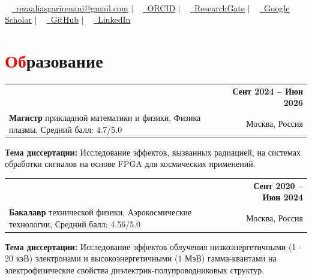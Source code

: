 \documentclass[a4paper, 10pt]{article}
\makeatletter
\newcommand{\resumeItem}[1]{
    \item\small{
        {#1 \vspace{-2pt}}
    }
}
\newcommand{\resumeSubheading}[4]{
    \vspace{-2pt}\item
    \begin{tabular*}{1.0\textwidth}[t]{l@{\extracolsep{\fill}}r}
        \textbf{#1} & \textbf{\small #2} \\
        \small#3 & \small #4
    \end{tabular*}\vspace{-7pt}
}
\newcommand{\resumeSubHeadingListStart}{\begin{itemize}[leftmargin=0.0in, label={}]}
\newcommand{\resumeSubHeadingListEnd}{\end{itemize}}
\makeatother
\begin{document}
\begin{center}
    {\Huge {\fontsize{25}{30}\selectfont{Реза}} {\fontsize{25}{30}}} \\ \vspace{3pt}
    \small ~ 
    \href{mailto:rezaaliasgarirenani@gmail.com}{\raisebox{-0.2\height}\faEnvelope\ \underline{rezaaliasgarirenani@gmail.com}} $|$ ~
    \href{https://orcid.org/0009-0000-8983-755X}{\raisebox{-0.2\height}\faOrcid\ \underline{ORCID}} $|$ ~
    \href{https://www.researchgate.net/profile/Reza-Aliasgari-Renani}{\raisebox{-0.2\height}\faResearchgate\
    \underline{ResearchGate}} $|$ ~
    \href{https://scholar.google.com/citations?user=L9Vv3C8AAAAJ&hl=en}{\raisebox{-0.2\height}\faGraduationCap\ \underline{Google Scholar}} $|$ ~
    \href{https://github.com/rezaaliasgarirenani}{\raisebox{-0.2\height}\faGithub\ \underline{GitHub}} $|$ ~
    \href{https://linkedin.com/in/reza-aliasgari-renani}{\raisebox{-0.2\height}\faLinkedin\ \underline{LinkedIn}}
    \vspace{-10pt}
\end{center}

\section{\textcolor{red}{Об}разование}
\resumeSubHeadingListStart
    \resumeSubheading
        {\href{https://mipt.ru/}{\parbox[t]{\dimexpr\linewidth-6cm}{Московский физико-технический институт (МФТИ, Физтех)}}}{Сент 2024 -- Июн 2026}
        {\textbf{Магистр} прикладной математики и физики, Физика плазмы, Средний балл: 4.7/5.0}{Москва, Россия}
        {\resumeItem{\textbf{Тема диссертации:} Исследование эффектов, вызванных радиацией, на системах обработки сигналов на основе FPGA для космических применений.}}
    \resumeSubheading
        {\href{https://mipt.ru/}{\parbox[t]{\dimexpr\linewidth-6cm}{Московский физико-технический институт (МФТИ, Физтех)}}}{Сент 2020 -- Июн 2024}
        {\textbf{Бакалавр} технической физики, Аэрокосмические технологии, Средний балл: 4.56/5.0}{Москва, Россия}
        {\resumeItem{\textbf{Тема диссертации:} Исследование эффектов облучения низкоэнергетичными (1 - 20 кэВ) электронами и высокоэнергетичными (1 МэВ) гамма-квантами на электрофизические свойства диэлектрик-полупроводниковых структур.}}
\resumeSubHeadingListEnd
\vspace{-10pt}

\end{document}
